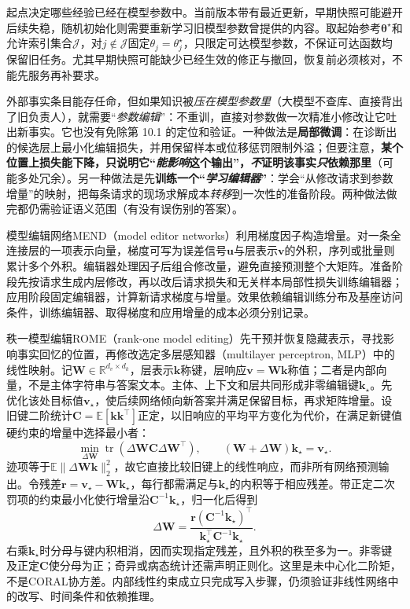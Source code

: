 起点决定哪些经验已经在模型参数中。当前版本带有最近更新，早期快照可能避开后续失稳，随机初始化则需要重新学习旧模型参数曾提供的内容。取起始参考$\bm\theta^\star$和允许索引集合$\mathcal J$，对$j\notin\mathcal J$固定$\theta_j=\theta_j^\star$，只限定可达模型参数，不保证可达函数均保留旧任务。尤其早期快照可能缺少已经生效的修正与撤回，恢复前必须核对，不能先服务再补要求。

外部事实条目能存任命，但如果知识被\emph{压在模型参数里}（大模型不查库、直接背出了旧负责人），就需要“\emph{参数编辑}”：不重训，直接对参数做一次精准小修改让它吐出新事实。它也没有免除第 10.1 的定位和验证。一种做法是\textbf{局部微调}：在诊断出的候选层上最小化编辑损失，并用保留样本或位移惩罚限制外溢；但要注意，\textbf{某个位置上损失能下降，只说明它“\emph{能影响}这个输出”，\emph{不}证明该事实\emph{只}依赖那里}（可能多处冗余）。另一种做法是先\textbf{训练一个“\emph{学习编辑器}”}：学会“从修改请求到参数增量”的映射，把每条请求的现场求解成本\emph{转移}到一次性的准备阶段。两种做法做完都仍需验证语义范围（有没有误伤别的答案）。

模型编辑网络MEND（model editor networks）利用梯度因子构造增量。对一条全连接层的一项表示向量，梯度可写为误差信号$\bm u$与层表示$\bm v$的外积，序列或批量则累计多个外积。编辑器处理因子后组合修改量，避免直接预测整个大矩阵。准备阶段先按请求生成内层修改，再以改后请求损失和无关样本局部性损失训练编辑器；应用阶段固定编辑器，计算新请求梯度与增量。效果依赖编辑训练分布及基座访问条件，训练编辑器、取得梯度和应用增量的成本必须分别记录。

秩一模型编辑ROME（rank-one model editing）先干预并恢复隐藏表示，寻找影响事实回忆的位置，再修改选定多层感知器（multilayer perceptron, MLP）中的线性映射。记$\bm W\in\mathbb R^{d_v\times d_k}$，层表示$\bm k$称键，层响应$\bm v=\bm W\bm k$称值；二者是内部向量，不是主体字符串与答案文本。主体、上下文和层共同形成非零编辑键$\bm k_\star$。先优化该处目标值$\bm v_\star$，使后续网络倾向新答案并满足保留目标，再求矩阵增量。设旧键二阶统计$\bm C=\mathbb E[\bm k\bm k^\top]$正定，以旧响应的平均平方变化为代价，在满足新键值硬约束的增量中选择最小者：
\begin{equation}
\min_{\Delta\bm W}\operatorname{tr}
(\Delta\bm W\bm C\Delta\bm W^\top),
\qquad
(\bm W+\Delta\bm W)\bm k_\star=\bm v_\star.
\label{eq:ket-update-rome-problem}
\end{equation}
迹项等于$\mathbb E\lVert\Delta\bm W\bm k\rVert_2^2$，故它直接比较旧键上的线性响应，而非所有网络预测输出。令残差$\bm r=\bm v_\star-\bm W\bm k_\star$，每行都需满足与$\bm k_\star$的内积等于相应残差。带正定二次罚项的约束最小化使行增量沿$\bm C^{-1}\bm k_\star$，归一化后得到
\begin{equation}
\Delta\bm W=
\frac{\bm r(\bm C^{-1}\bm k_\star)^\top}
{\bm k_\star^\top\bm C^{-1}\bm k_\star}.
\label{eq:ket-update-rome}
\end{equation}
右乘$\bm k_\star$时分母与键内积相消，因而实现指定残差，且外积的秩至多为一。非零键及正定$\bm C$使分母为正；奇异或病态统计还需声明正则化。这里是未中心化二阶矩，不是CORAL协方差。内部线性约束成立只完成写入步骤，仍须验证非线性网络中的改写、时间条件和依赖推理。

